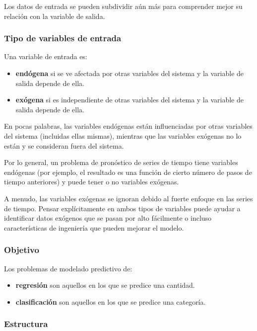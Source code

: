 \documentclass[a4paper,12pt]{article}
\begin{document}
Los datos de entrada se pueden subdividir aún más para comprender mejor su relación con la variable de salida.

\subsubsection{Tipo de variables de entrada}

Una variable de entrada es:
\begin{itemize}
	\item \textbf{endógena} si se ve afectada por otras variables del sistema y la variable de salida depende de ella.
	\item \textbf{exógena} si es independiente de otras variables del sistema y la variable de salida depende de ella.
\end{itemize}

En pocas palabras, las variables endógenas están influenciadas por otras variables del sistema (incluidas ellas mismas), mientras que las variables exógenas no lo están y se consideran fuera del sistema.

Por lo general, un problema de pronóstico de series de tiempo tiene variables endógenas (por ejemplo, el resultado es una función de cierto número de pasos de tiempo anteriores) y puede tener o no variables exógenas.

A menudo, las variables exógenas se ignoran debido al fuerte enfoque en las series de tiempo. Pensar explícitamente en ambos tipos de variables puede ayudar a identificar datos exógenos que se pasan por alto fácilmente o incluso características de ingeniería que pueden mejorar el modelo.

\subsubsection{Objetivo}

Los problemas de modelado predictivo de:

\begin{itemize}
	\item \textbf{regresión} son aquellos en los que se predice una cantidad.
	\item  \textbf{clasificación} son aquellos en los que se predice una categoría.
\end{itemize}

\subsubsection{Estructura}
\end{document}
